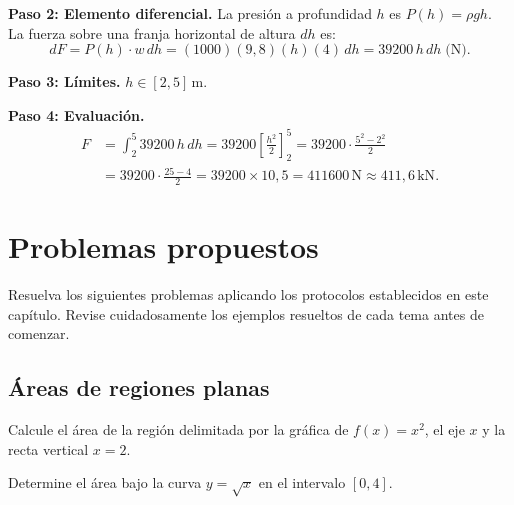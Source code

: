 \begin{example}
\begin{myproof}
\textbf{Paso 2: Elemento diferencial.}
La presión a profundidad $h$ es $P(h)=\rho g h$. La fuerza sobre una
franja horizontal de altura $dh$ es:
\[
  dF = P(h)\cdot w\,dh = (1000)(9{,}8)(h)(4)\,dh = 39200\,h\,dh\;\text{(N)}.
\]

\textbf{Paso 3: Límites.} $h\in[2,5]\,\text{m}$.

\textbf{Paso 4: Evaluación.}
\begin{align*}
  F &= \int_2^5 39200\,h\,dh
     = 39200\left[\frac{h^2}{2}\right]_2^5
     = 39200\cdot\frac{5^2-2^2}{2} \\
    &= 39200\cdot\frac{25-4}{2}
     = 39200\times 10{,}5
     = \boxed{411600\,\text{N} \approx 411{,}6\,\text{kN}}.
\end{align*}
\end{myproof}
\end{example}

\section{Problemas propuestos}


Resuelva los siguientes problemas aplicando los protocolos establecidos en este capítulo. Revise cuidadosamente los ejemplos resueltos de cada tema antes de comenzar.

\subsection{Áreas de regiones planas}


\begin{prob}
Calcule el área de la región delimitada por la gráfica de $f(x) = x^2$, el eje $x$ y la recta vertical $x = 2$.
\end{prob}

\begin{prob}
Determine el área bajo la curva $y = \sqrt{x}$ en el intervalo $[0, 4]$.
\end{prob}



